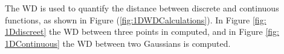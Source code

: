 \documentclass[10pt]{article}
\newcommand\numberthis{\addtocounter{equation}{1}\tag{\theequation}}
\begin{document}

\noindent The WD is used to quantify the distance between  discrete and continuous functions, as shown in Figure (\ref{fig:1DWDCalculations}). In Figure \ref{fig: 1Ddiscreet} the WD between three points in computed, and in Figure \ref{fig: 1DContinuous} the WD between two Gaussians is computed.

\end{document}
